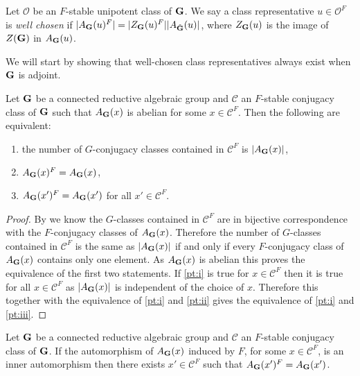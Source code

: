 \documentclass{jt-calcs}
\begin{document}
\begin{definition}
Let $\mathcal{O}$ be an $F$-stable unipotent class of $\mathbf{G}$. We say a class representative $u \in \mathcal{O}^F$ is \emph{well chosen} if $|A_{\mathbf{G}}(u)^F| = |Z_{\mathbf{G}}(u)^F||A_{\tilde{\mathbf{G}}}(u)|$, where $Z_{\mathbf{G}}(u)$ is the image of $Z(\mathbf{G})$ in $A_{\mathbf{G}}(u)$.
\end{definition}

\noindent We will start by showing that well-chosen class representatives always exist when $\mathbf{G}$ is adjoint.

\begin{lem}\label{lem:abelian-comp-group}
Let $\mathbf{G}$ be a connected reductive algebraic group and $\mathcal{C}$ an $F$-stable conjugacy class of $\mathbf{G}$ such that $A_{\mathbf{G}}(x)$ is abelian for some $x \in \mathcal{C}^F$. Then the following are equivalent:
\begin{enumerate}
	\item the number of $G$-conjugacy classes contained in $\mathcal{C}^F$ is $|A_{\mathbf{G}}(x)|$\label{pt:i},
	\item $A_{\mathbf{G}}(x)^F = A_{\mathbf{G}}(x)$\label{pt:ii},
	\item $A_{\mathbf{G}}(x')^F = A_{\mathbf{G}}(x')$ for all $x' \in \mathcal{C}^F$\label{pt:iii}.
\end{enumerate}
\end{lem}

\begin{proof}
By \cite[Theorem 4.3.5]{geck:2003:intro-to-algebraic-geometry} we know the $G$-classes contained in $\mathcal{C}^F$ are in bijective correspondence with the $F$-conjugacy classes of $A_{\mathbf{G}}(x)$. Therefore the number of $G$-classes contained in $\mathcal{C}^F$ is the same as $|A_{\mathbf{G}}(x)|$ if and only if every $F$-conjugacy class of $A_{\mathbf{G}}(x)$ contains only one element. As $A_{\mathbf{G}}(x)$ is abelian this proves the equivalence of the first two statements. If \ref{pt:i} is true for $x \in \mathcal{C}^F$ then it is true for all $x \in \mathcal{C}^F$ as $|A_{\mathbf{G}}(x)|$ is independent of the choice of $x$. Therefore this together with the equivalence of \ref{pt:i} and \ref{pt:ii} gives the equivalence of \ref{pt:i} and \ref{pt:iii}.
\end{proof}

\begin{lem}\label{lem:inner-auto-comp-grp}
Let $\mathbf{G}$ be a connected reductive algebraic group and $\mathcal{C}$ an $F$-stable conjugacy class of $\mathbf{G}$. If the automorphism of $A_{\mathbf{G}}(x)$ induced by $F$, for some $x \in \mathcal{C}^F$, is an inner automorphism then there exists $x' \in \mathcal{C}^F$ such that $A_{\mathbf{G}}(x')^F = A_{\mathbf{G}}(x')$.
\end{lem}
\end{document}

